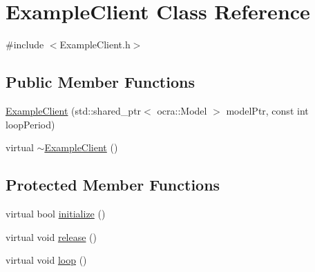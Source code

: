 \hypertarget{classExampleClient}{\section{\-Example\-Client \-Class \-Reference}
\label{classExampleClient}
}


{\ttfamily \#include $<$\-Example\-Client.\-h$>$}

\subsection*{\-Public \-Member \-Functions}
\begin{DoxyCompactItemize}
\item 
\hyperlink{classExampleClient_aed7d851662cba1484ecf1db8161d6e62}{\-Example\-Client} (std\-::shared\-\_\-ptr$<$ ocra\-::\-Model $>$ model\-Ptr, const int loop\-Period)
\item 
virtual \hyperlink{classExampleClient_abdca7dbe5fdab81d7d661a677e5ccd14}{$\sim$\-Example\-Client} ()
\end{DoxyCompactItemize}
\subsection*{\-Protected \-Member \-Functions}
\begin{DoxyCompactItemize}
\item 
virtual bool \hyperlink{classExampleClient_ad504d1d87997fc95bfeca6aa925a4fa6}{initialize} ()
\item 
virtual void \hyperlink{classExampleClient_a5acf25784c1c5b51c2c085327f195002}{release} ()
\item 
virtual void \hyperlink{classExampleClient_afb58f3425aafe2d4c38195cb3c667dbc}{loop} ()
\end{DoxyCompactItemize}
